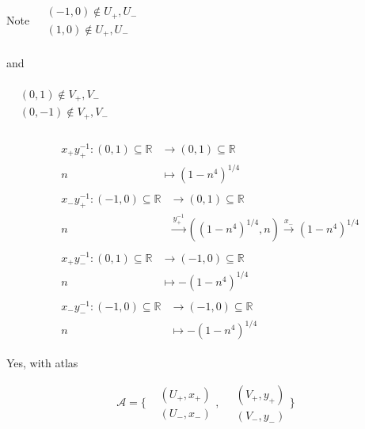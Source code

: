 Note $\begin{aligned} & \quad \\ 
& (-1,0) \notin U_+,U_- \\
& (1,0) \notin U_+,U_- \\
\end{aligned}$

and 

$\begin{aligned} & \quad \\ 
& (0,1) \notin V_+,V_- \\
& (0,-1) \notin V_+,V_- \\
\end{aligned}$



\solutionhead{}

\[
\begin{aligned}
& 
\begin{aligned}
x_+y_+^{-1} : (0,1) \subseteq \mathbb{R} & \to (0,1) \subseteq \mathbb{R} \\ 
n & \mapsto (1-n^4)^{1/4} 
\end{aligned}   \\ 
& 
\begin{aligned}
x_-y_+^{-1} : (-1,0) \subseteq \mathbb{R} & \to (0,1) \subseteq \mathbb{R} \\ 
n & \xrightarrow{ y_+^{-1} } ( (1-n^4)^{1/4}, n) \xrightarrow{ x_- } (1-n^4)^{1/4} 
\end{aligned}   \\ 
& \begin{aligned}
x_+y_-^{-1} : (0,1) \subseteq \mathbb{R} & \to (-1,0) \subseteq \mathbb{R} \\ 
n & \mapsto -(1-n^4)^{1/4} 
\end{aligned}   \\ 
& \begin{aligned}
x_-y_-^{-1} : (-1,0) \subseteq \mathbb{R} & \to (-1,0) \subseteq \mathbb{R} \\ 
n & \mapsto -(1-n^4)^{1/4} 
\end{aligned}   
\end{aligned}
\]


Yes, with atlas

\[
\mathcal{A} = \lbrace \begin{aligned} & (U_+,x_+) \\
& (U_-,x_-) \end{aligned}, \, \begin{aligned} & (V_+,y_+) \\ & (V_-,y_-) \end{aligned} \rbrace
\]


